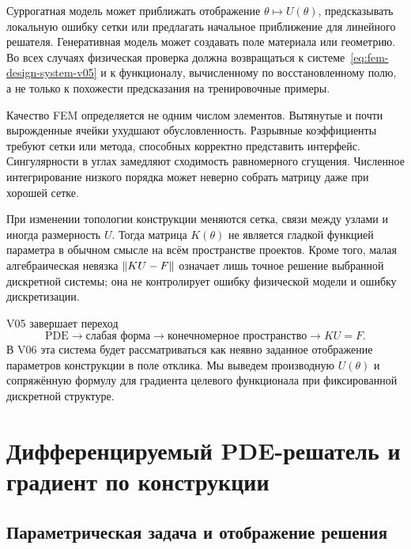 \begin{mlconnection}
Суррогатная модель может приближать отображение $\theta\mapsto U(\theta)$, предсказывать локальную ошибку сетки или предлагать начальное приближение для линейного решателя. Генеративная модель может создавать поле материала или геометрию. Во всех случаях физическая проверка должна возвращаться к системе~\eqref{eq:fem-design-system-v05} и к функционалу, вычисленному по восстановленному полю, а не только к похожести предсказания на тренировочные примеры.
\end{mlconnection}

Качество FEM определяется не одним числом элементов. Вытянутые и почти вырожденные ячейки ухудшают обусловленность. Разрывные коэффициенты требуют сетки или метода, способных корректно представить интерфейс. Сингулярности в углах замедляют сходимость равномерного сгущения. Численное интегрирование низкого порядка может неверно собрать матрицу даже при хорошей сетке.

При изменении топологии конструкции меняются сетка, связи между узлами и иногда размерность $U$. Тогда матрица $K(\theta)$ не является гладкой функцией параметра в обычном смысле на всём пространстве проектов. Кроме того, малая алгебраическая невязка $\lVert KU-F\rVert$ означает лишь точное решение выбранной дискретной системы; она не контролирует ошибку физической модели и ошибку дискретизации.

V05 завершает переход
\[
 \text{PDE}
 \longrightarrow
 \text{слабая форма}
 \longrightarrow
 \text{конечномерное пространство}
 \longrightarrow
 KU=F.
\]
В V06 эта система будет рассматриваться как неявно заданное отображение параметров конструкции в поле отклика. Мы выведем производную $U(\theta)$ и сопряжённую формулу для градиента целевого функционала при фиксированной дискретной структуре.


\section{Дифференцируемый PDE-решатель и градиент по конструкции}
\label{sec:differentiable-pde-solver}

\subsection{Параметрическая задача и отображение решения}

